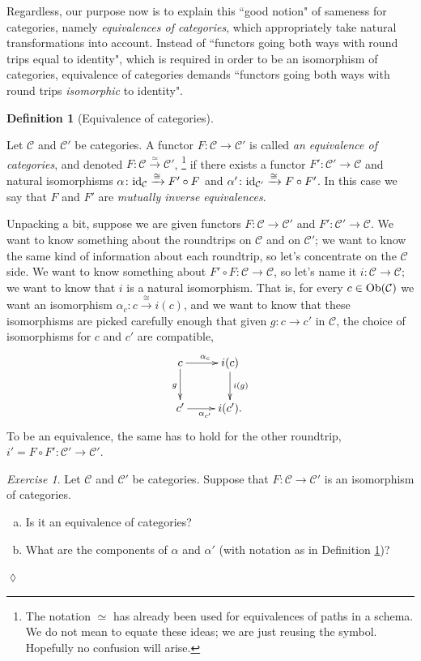 \documentclass{book}
\def\tn{\textnormal}
\def\mc{\mathcal}
\def\Ob{\tn{Ob}}
\def\to{\rightarrow}
\def\taking{\colon}
\def\iso{\cong}
\newcommand{\To}[1]{\xrightarrow{#1}}
\def\id{\tn{id}}
\def\mcC{\mc{C}}
\theoremstyle{remark}
\newtheorem{exc}[subsubsection]{Exercise}
\newenvironment{exercise}{\begin{exc}}{\hspace*{\fill}$\lozenge$\end{exc}}
\theoremstyle{definition}
\newtheorem{definition}[subsubsection]{Definition}
\def\sexc{\begin{enumerate}[a.)]\setlength{\itemsep}{.1cm}\setlength{\parskip}{.1cm}\item}
\def\next{\item}
\def\endsexc{\end{enumerate}}
\begin{document}
Regardless, our purpose now is to explain this ``good notion" of sameness for categories, namely {\em equivalences of categories}, which appropriately take natural transformations into account. Instead of ``functors going both ways with round trips equal to identity", which is required in order to be an isomorphism of categories, equivalence of categories demands ``functors going both ways with round trips {\em isomorphic} to identity".

\begin{definition}[Equivalence of categories]\label{def:equiv of cats}

Let $\mcC$ and $\mcC'$ be categories. A functor $F\taking\mcC\to\mcC'$ is called {\em an equivalence of categories}, and denoted $F\taking\mcC\To{\simeq}\mcC'$,
\footnote{The notation $\simeq$ has already been used for equivalences of paths in a schema. We do not mean to equate these ideas; we are just reusing the symbol. Hopefully no confusion will arise.}
 if there exists a functor $F'\taking\mcC'\to\mcC$ and natural isomorphisms $\alpha\taking \id_\mcC\To{\iso}F'\circ F$ and $\alpha'\taking\id_{\mcC'}\To{\iso}F\circ F'$. In this case we say that $F$ and $F'$ are {\em mutually inverse equivalences}.

\end{definition}

Unpacking a bit, suppose we are given functors $F\taking\mcC\to\mcC'$ and $F'\taking\mcC'\to\mcC$. We want to know something about the roundtrips on $\mcC$ and on $\mcC'$; we want to know the same kind of information about each roundtrip, so let's concentrate on the $\mcC$ side. We want to know something about $F'\circ F\taking\mcC\to\mcC$, so let's name it $i\taking\mcC\to\mcC$; we want to know that $i$ is a natural isomorphism. That is, for every $c\in\Ob(\mcC)$ we want an isomorphism $\alpha_c\taking c\To{\iso} i(c)$, and we want to know that these isomorphisms are picked carefully enough that given $g\taking c\to c'$ in $\mcC$, the choice of isomorphisms for $c$ and $c'$ are compatible,
$$\xymatrix{c\ar[r]^{\alpha_c}\ar[d]_g&i(c)\ar[d]^{i(g)}\\c'\ar[r]_{\alpha_{c'}}&i(c').}$$
To be an equivalence, the same has to hold for the other roundtrip, $i'=F\circ F'\taking\mcC'\to\mcC'.$

\begin{exercise}
Let $\mcC$ and $\mcC'$ be categories. Suppose that $F\taking\mcC\to\mcC'$ is an isomorphism of categories.
\sexc Is it an equivalence of categories?
\next What are the components of $\alpha$ and $\alpha'$ (with notation as in Definition \ref{def:equiv of cats})?
\endsexc
\end{exercise}
\end{document}

